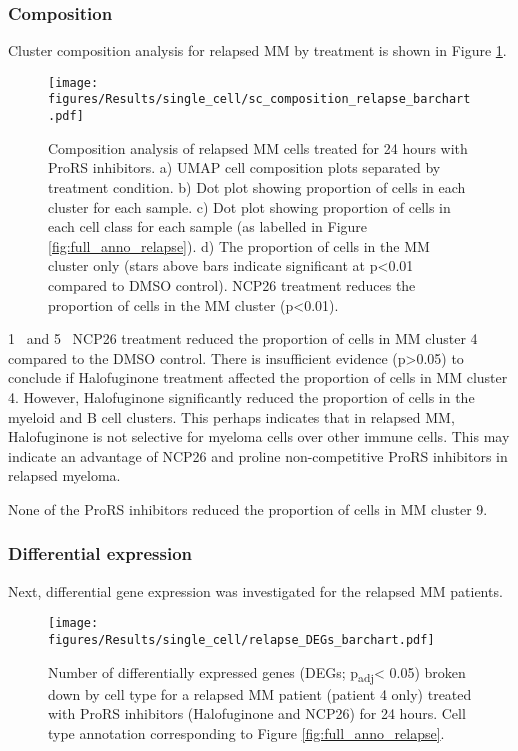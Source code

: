 \subsubsection{Composition}
Cluster composition analysis for relapsed MM by treatment is shown in Figure \ref{fig:composition_relapse}.
\begin{figure}[htb]
\centering
\texttt{[image: figures/Results/single\_cell/sc\_composition\_relapse\_barchart.pdf]}
\caption[scRNA-seq composition analysis- relapsed MM]{Composition analysis of relapsed MM cells treated for 24 hours with ProRS inhibitors.
    a) UMAP cell composition plots separated by treatment condition.
    b) Dot plot showing proportion of cells in each cluster for each sample.
    c) Dot plot showing proportion of cells in each cell class for each sample (as labelled in Figure \ref{fig:full_anno_relapse}).
    d) The proportion of cells in the MM cluster only (stars above bars indicate significant at p<0.01 compared to DMSO control).
NCP26 treatment reduces the proportion of cells in the MM cluster (p<0.01).}
\label{fig:composition_relapse}
\end{figure}
1\si{\micro\Molar} and 5\si{\micro\Molar} NCP26 treatment reduced the proportion of cells in MM cluster 4 compared to the DMSO control.
There is insufficient evidence (p>0.05) to conclude if Halofuginone treatment affected the proportion of cells in MM cluster 4.
However, Halofuginone significantly reduced the proportion of cells in the myeloid and B cell clusters.
This perhaps indicates that in relapsed MM, Halofuginone is not selective for myeloma cells over other immune cells.
This may indicate an advantage of NCP26 and proline non-competitive ProRS inhibitors in relapsed myeloma.

None of the ProRS inhibitors reduced the proportion of cells in MM cluster 9.

\subsubsection{Differential expression}
Next, differential gene expression was investigated for the relapsed MM patients.
%
\begin{figure}[htb]
\centering
\texttt{[image: figures/Results/single\_cell/relapse\_DEGs\_barchart.pdf]}
\caption[scRNA-seq DEGs per cell type- relapsed MM]{Number of differentially expressed genes (DEGs; p\textsubscript{adj}< 0.05) broken down by cell type for a relapsed MM patient (patient 4 only) treated with ProRS inhibitors (Halofuginone and NCP26) for 24 hours.
Cell type annotation corresponding to Figure \ref{fig:full_anno_relapse}.}
\label{fig:relapse_deg_bar}
\end{figure}

